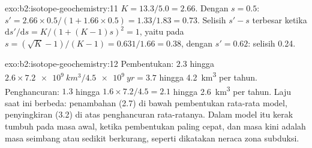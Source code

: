 \begin{solution}{exo:b2:isotope-geochemistry:11}
$K = 13.3/5.0 = 2.66$. Dengan $s = 0.5$: $s' = 2.66\times0.5/(1 + 1.66\times0.5) =
1.33/1.83 = 0.73$. Selisih $s' - s$ terbesar ketika
$\mathrm{d}s'/\mathrm{d}s = K/(1+(K-1)s)^2 = 1$, yaitu pada $s = (\sqrt K - 1)/(K-1) =
0.631/1.66 = 0.38$, dengan $s' = 0.62$: selisih 0.24.
\end{solution}

\begin{solution}{exo:b2:isotope-geochemistry:12}
Pembentukan: $2.3$ hingga $2.6\times\qty{7.2e9}{km^3}/\qty{4.5e9}{yr} = 3.7$ hingga
\qty{4.2}{km^3} per tahun. Penghancuran: $1.3$ hingga $1.6\times7.2/4.5 = 2.1$ hingga
\qty{2.6}{km^3} per tahun. Laju saat ini berbeda: penambahan (2.7) di bawah pembentukan
rata-rata model, penyingkiran (3.2) di atas penghancuran rata-ratanya. Dalam model itu kerak tumbuh
pada masa awal, ketika pembentukan paling cepat, dan masa kini adalah masa seimbang atau sedikit
berkurang, seperti dikatakan neraca zona subduksi.
\end{solution}

